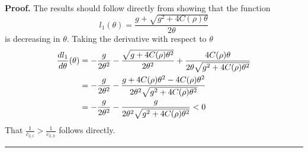 \documentclass[thmsb,11pt]{article}
\newenvironment{proof}[1][Proof]{\noindent \textbf{#1.} }{\  \rule{0.5em}{0.5em}}
\begin{document}
\begin{proof}
The results should follow directly from showing that
the function
\begin{equation*}
l_1(\theta) = \frac{g+\sqrt{g^2+4C(\rho)\theta}}{2\theta}
\end{equation*}%
is decreasing in $\theta$. Taking the derivative with respect to $\theta$
\begin{align*}
\frac{d l_1}{d\theta}(\theta) &=- \frac g{2\theta^2}-\frac{\sqrt{%
g+4C(\rho)\theta^2}}{2\theta^2} +\frac{4C(\rho)\theta}{2\theta\sqrt{%
g^2+4C(\rho)\theta^2}} \\
&=-\frac g{2\theta^2}-\frac{g+4C(\rho)\theta^2-4C(\rho)\theta^2}{2\theta^2%
\sqrt{g^2+4C(\rho)\theta^2}} \\
&=-\frac g{2\theta^2}-\frac{g}{2\theta^2\sqrt{g^2+4C(\rho)\theta^2}}<0
\end{align*}
That $\frac1{c_{2,l}}>\frac1{c_{2,h}}$ follows directly.
\end{proof}
\end{document}

